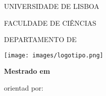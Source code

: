 \thispagestyle{empty}


{\coverfont

\begin{center}

{\large 
UNIVERSIDADE DE LISBOA
\vspace{8.0pt}

FACULDADE DE CIÊNCIAS
\vspace{8.0pt}

DEPARTAMENTO DE \departmentname
\vspace{8.0pt}
}

\vspace{46pt}

\texttt{[image: images/logotipo.png]}

\vspace{117pt}

{\fontsize{17}{19.55}\coverfont\textbf{\thesisname}}

\vspace{110pt}

{\fontsize{15}{17.25}\coverfont\studentname}

\vspace{74pt}

{\fontsize{13}{14.95}\coverfont\textbf{Mestrado em {\coursename}}

\vspace{0.65pt}

\specname
}

\vspace{22pt}


\vspace{27pt}

{\fontsize{13}{14.95}\coverfont
{\thesistype} orientad por: 

\alcides

\chris

\vspace{3pt}

\vspace{3pt}

}

~
\vfill

{\Large\the\year{}}

\end{center}
}

\restoregeometry